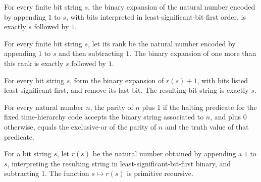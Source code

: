 \begin{theorem}
\label{Complexity.ntc_bits_codeBitsNat_append_true}
\leanok
{}
For every finite bit string $s$, the binary expansion of the natural number encoded by
appending $1$ to $s$, with bits interpreted in least-significant-bit-first order, is
exactly $s$ followed by $1$.
\end{theorem}

\begin{theorem}
\label{Complexity.ntc_bits_rank_succ}
\leanok
{}
For every finite bit string $s$, let its rank be the natural number encoded by appending
$1$ to $s$ and then subtracting $1$. The binary expansion of one more than this rank is
exactly $s$ followed by $1$.
\end{theorem}

\begin{theorem}
\label{Complexity.ntc_str_rank}
\leanok
{}
For every bit string $s$, form the binary expansion of $r(s)+1$, with bits listed
least-significant first, and remove its last bit. The resulting bit string is exactly
$s$.
\end{theorem}

\begin{theorem}
\label{Complexity.ntc_bodd_T}
\leanok
{}
For every natural number $n$, the parity of $n$ plus $1$ if the halting predicate for
the fixed time-hierarchy code accepts the binary string associated to $n$, and plus $0$
otherwise, equals the exclusive-or of the parity of $n$ and the truth value of that
predicate.
\end{theorem}

\begin{theorem}
\label{Complexity.ntc_primrec_rank}
\leanok
{}
For a bit string $s$, let $r(s)$ be the natural number obtained by appending a $1$ to
$s$, interpreting the resulting string in least-significant-bit-first binary, and
subtracting $1$. The function $s\mapsto r(s)$ is primitive recursive.
\end{theorem}


